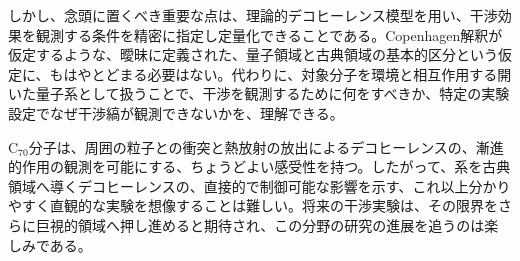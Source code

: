 しかし、念頭に置くべき重要な点は、理論的デコヒーレンス模型を用い、干渉効果を観測する条件を精密に指定し定量化できることである。Copenhagen解釈が仮定するような、曖昧に定義された、量子領域と古典領域の基本的区分という仮定に、もはやとどまる必要はない。代わりに、対象分子を環境と相互作用する開いた量子系として扱うことで、干渉を観測するために何をすべきか、特定の実験設定でなぜ干渉縞が観測できないかを、理解できる。

$\mathrm C_{70}$分子は、周囲の粒子との衝突と熱放射の放出によるデコヒーレンスの、漸進的作用の観測を可能にする、ちょうどよい感受性を持つ。したがって、系を古典領域へ導くデコヒーレンスの、直接的で制御可能な影響を示す、これ以上分かりやすく直観的な実験を想像することは難しい。将来の干渉実験は、その限界をさらに巨視的領域へ押し進めると期待され、この分野の研究の進展を追うのは楽しみである。
